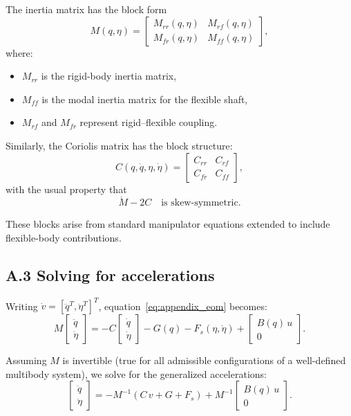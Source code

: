 \documentclass[12pt]{article}
\begin{document}
The inertia matrix has the block form
\[
  M(q,\eta)
  =
  \begin{bmatrix}
    M_{rr}(q,\eta) & M_{rf}(q,\eta) \\
    M_{fr}(q,\eta) & M_{ff}(q,\eta)
  \end{bmatrix},
\]
where:
\begin{itemize}
  \item \(M_{rr}\) is the rigid-body inertia matrix,
  \item \(M_{ff}\) is the modal inertia matrix for the flexible shaft,
  \item \(M_{rf}\) and \(M_{fr}\) represent rigid–flexible coupling.
\end{itemize}

Similarly, the Coriolis matrix has the block structure:
\[
  C(q,\dot{q},\eta,\dot{\eta})
  =
  \begin{bmatrix}
    C_{rr} & C_{rf} \\
    C_{fr} & C_{ff}
  \end{bmatrix},
\]
with the usual property that  
\[
  \dot{M} - 2C \quad \text{is skew-symmetric}.
\]

These blocks arise from standard manipulator equations extended to include flexible-body contributions.

\subsection{A.3 \quad Solving for accelerations}

Writing \(\dot{v} = [\ddot{q}^{T}, \ddot{\eta}^{T}]^{T}\), equation~\eqref{eq:appendix_eom} becomes:
\begin{equation}
  M
  \begin{bmatrix}
    \ddot{q} \\ \ddot{\eta}
  \end{bmatrix}
  =
  -
  C
  \begin{bmatrix}
    \dot{q} \\ \dot{\eta}
  \end{bmatrix}
  - 
  G(q)
  -
  F_s(\eta,\dot{\eta})
  +
  \begin{bmatrix}
    B(q)\,u \\ 0
  \end{bmatrix}.
  \label{eq:appendix_accel_base}
\end{equation}

Assuming \(M\) is invertible (true for all admissible configurations of a well-defined multibody system), we solve for the generalized accelerations:
\begin{equation}
  \begin{bmatrix}
    \ddot{q} \\ \ddot{\eta}
  \end{bmatrix}
  =
  - M^{-1}
  \left(
    C\,v + G + F_{s}
  \right)
  +
  M^{-1}
  \begin{bmatrix}
    B(q)\,u \\ 0
  \end{bmatrix}.
  \label{eq:appendix_accel_split}
\end{equation}
\end{document}
